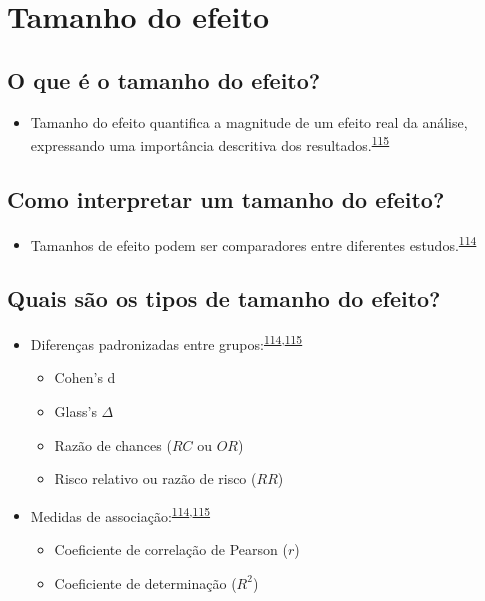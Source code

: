 \documentclass[
]{book}
\providecommand{\tightlist}{%
  \setlength{\itemsep}{0pt}\setlength{\parskip}{0pt}}
\begin{document}
\hypertarget{tamanho-efeito}{%
\section{Tamanho do efeito}\label{tamanho-efeito}}

\hypertarget{o-que-uxe9-o-tamanho-do-efeito}{%
\subsection{O que é o tamanho do efeito?}\label{o-que-uxe9-o-tamanho-do-efeito}}

\begin{itemize}
\tightlist
\item
  Tamanho do efeito quantifica a magnitude de um efeito real da análise, expressando uma importância descritiva dos resultados.\textsuperscript{\protect\hyperlink{ref-Kim2015}{115}}
\end{itemize}

\hypertarget{como-interpretar-um-tamanho-do-efeito}{%
\subsection{Como interpretar um tamanho do efeito?}\label{como-interpretar-um-tamanho-do-efeito}}

\begin{itemize}
\tightlist
\item
  Tamanhos de efeito podem ser comparadores entre diferentes estudos.\textsuperscript{\protect\hyperlink{ref-Sullivan2012}{114}}
\end{itemize}

\hypertarget{quais-suxe3o-os-tipos-de-tamanho-do-efeito}{%
\subsection{Quais são os tipos de tamanho do efeito?}\label{quais-suxe3o-os-tipos-de-tamanho-do-efeito}}

\begin{itemize}
\item
  Diferenças padronizadas entre grupos:\textsuperscript{\protect\hyperlink{ref-Sullivan2012}{114},\protect\hyperlink{ref-Kim2015}{115}}

  \begin{itemize}
  \item
    Cohen's d
  \item
    Glass's \(\Delta\)
  \item
    Razão de chances (\(RC\) ou \(OR\))
  \item
    Risco relativo ou razão de risco (\(RR\))
  \end{itemize}
\item
  Medidas de associação:\textsuperscript{\protect\hyperlink{ref-Sullivan2012}{114},\protect\hyperlink{ref-Kim2015}{115}}

  \begin{itemize}
  \item
    Coeficiente de correlação de Pearson (\(r\))
  \item
    Coeficiente de determinação (\(R^2\))
  \end{itemize}
\end{itemize}
\end{document}
